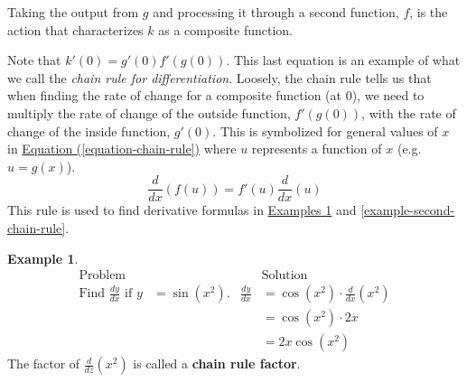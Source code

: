 \documentclass[10pt,oneside,]{book}
\newcommand{\terminology}[1]{\textbf{#1}}
\theoremstyle{plain}
\theoremstyle{definition}
\newtheorem{example}[theorem]{Example}
\numberwithin{equation}{section}
\newcounter{figstack}
\newcounter{figindex}
\newlength\fight
\newcommand\pushValignCaptionBottom[5][b]{%
\stepcounter{figstack}%
\expandafter\def\csname %
figalign\romannumeral\value{figstack}\endcsname{#1}%
\expandafter\def\csname %
figtype\romannumeral\value{figstack}\endcsname{#2}%
\expandafter\def\csname %
figwd\romannumeral\value{figstack}\endcsname{#3}%
\expandafter\def\csname %
figcontent\romannumeral\value{figstack}\endcsname{#4}%
\expandafter\def\csname %
figcap\romannumeral\value{figstack}\endcsname{#5}%
\setbox0=\hbox{%
\begin{#2}{#3}#4\end{#2}}%
\ifdim\dimexpr\ht0+\dp0\relax>\fight\global\setlength{\fight}{%
\dimexpr\ht0+\dp0\relax}\fi%
}
\newcommand\popValignCaptionBottom{%
\setcounter{figindex}{0}%
\hfill%
\whiledo{\value{figindex}<\value{figstack}}{%
\stepcounter{figindex}%
\def\tmp{\csname figwd\romannumeral\value{figindex}\endcsname}%
\begin{\csname figtype\romannumeral\value{figindex}\endcsname}[t]{\tmp}%
\centering%
\stackinset{c}{}%
{\csname figalign\romannumeral\value{figindex}\endcsname}{}%
{\csname figcontent\romannumeral\value{figindex}\endcsname}%
{\rule{0pt}{\fight}}\par%
\csname figcap\romannumeral\value{figindex}\endcsname%
\end{\csname figtype\romannumeral\value{figindex}\endcsname}%
\hfill%
}%
\setcounter{figstack}{0}%
\setlength{\fight}{0pt}%
\hfill%
}
\newcommand{\fe}[2]{#1\mathopen{}\left(#2\right)\mathclose{}}
\newcommand{\fd}[1]{#1'}
\newcommand{\lz}[2]{\frac{d#1}{d#2}}
\newcommand{\lzoo}[2]{{\frac{d}{d#1}}{\left(#2\right)}}
\begin{document}
\par
Taking the output from \(g\) and processing it through a second function, \(f\), is the action that characterizes \(k\) as a composite function.%
\par
Note that \(\fe{\fd{k}}{0}=\fe{\fd{g}}{0}\fe{\fd{f}}{\fe{g}{0}}\).  This last equation is an example of what we call the \emph{chain rule for differentiation}. Loosely, the chain rule tells us that when finding the rate of change for a composite function (at \(0\)), we need to multiply the rate of change of the outside function, \(\fe{\fd{f}}{\fe{g}{0}}\), with the rate of change of the inside function, \(\fe{\fd{g}}{0}\).  This is symbolized for general values of \(x\) in \hyperref[equation-chain-rule]{Equation (\ref{equation-chain-rule})} where \(u\) represents a function of \(x\) (e.g.\@ \(u=\fe{g}{x}\)). \begin{equation}\lzoo{x}{\fe{f}{u}}=\fe{\fd{f}}{u}\lzoo{x}{u}\label{equation-chain-rule}\end{equation}This rule is used to find derivative formulas in \hyperref[example-chain-rule]{Examples \ref{example-chain-rule}} and \hyperref[example-second-chain-rule]{\ref{example-second-chain-rule}}.%
\begin{example}\label{example-chain-rule}
\begin{align*}
\text{Problem}&&&\text{Solution}\\
\text{Find }\lz{y}{x}\text{ if }y&=\fe{\sin}{x^2}\text{.}&\lz{y}{x}&=\fe{\cos}{x^2}\cdot\lzoo{x}{x^2}\\
&&&=\fe{\cos}{x^2}\cdot2x\\
&&&=2x\fe{\cos}{x^2}
\end{align*}The factor of \(\lzoo{z}{x^2}\) is called a \terminology{chain rule factor}.%
\end{example}
\end{document}
